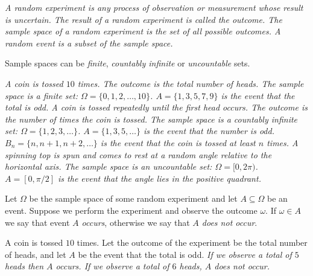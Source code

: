 
\begin{definition}
\ben
\it A \emph{random experiment} is any process of observation or measurement whose result is uncertain.
\it The result of a random experiment is called the \emph{outcome}.
\it The \emph{sample space} of a random experiment is the set of all possible outcomes.
\it A \emph{random event} is a subset of the sample space.
\een
\end{definition}

Sample spaces can be \emph{finite}, \emph{countably infinite} or \emph{uncountable} sets.
\begin{example}
\ben
\it A coin is tossed $10$ times. The outcome is the total number of heads.
	\bit
	\it The sample space is a finite set: $\Omega = \{0,1,2,\ldots,10\}$.
	\it $A = \{1,3,5,7,9\}$ is the event that the total is odd.
	\eit
\it A coin is tossed repeatedly until the first head occurs. The outcome is the number of times the coin is tossed.
	\bit
	\it The sample space is a countably infinite set: $\Omega = \{1,2,3,\ldots\}$.
	\it $A = \{1,3,5,\ldots\}$ is the event that the number is odd.
	\it $B_n = \{n, n+1,n+2,\ldots\}$ is the event that the coin is tossed at least $n$ times.
	\eit
\it A spinning top is spun and comes to rest at a random angle relative to the horizontal axis.
	\bit
	\it The sample space is an uncountable set: $\Omega = [0,2\pi)$.
	\it $A = [0,\pi/2]$ is the event that the angle lies in the positive quadrant.
	\eit
\een
\end{example}

\begin{definition}
Let $\Omega$ be the sample space of some random experiment and let $A\subseteq\Omega$ be an event. Suppose we perform the experiment and observe the outcome $\omega$. If $\omega\in A$ we say that event \emph{$A$ occurs}, otherwise we say that \emph{$A$ does not occur}.
\end{definition}

\begin{example}
A coin is tossed $10$ times. Let the outcome of the experiment be the total number of heads, and let $A$ be the event that the total is odd. 
\bit
\it If we observe a total of $5$ heads then $A$ occurs. 
\it If we observe a total of $6$ heads, $A$ does not occur.
\eit
\end{example}

